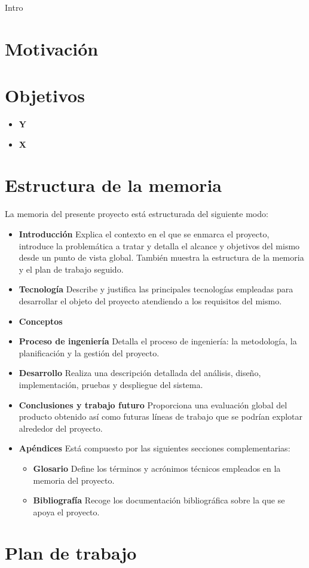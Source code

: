 Intro

\section{Motivación}


\section{Objetivos}

\begin{itemize}
\item \textbf{Y}
\item \textbf{X}
\end{itemize}


\section{Estructura de la memoria}
La memoria del presente proyecto está estructurada del siguiente modo:

\begin{itemize}
\item \textbf{Introducción} Explica el contexto en el que se enmarca el proyecto, introduce la problemática a tratar y detalla el alcance y objetivos del mismo desde un punto de vista global. También muestra la estructura de la memoria y el plan de trabajo seguido.

\item \textbf{Tecnología} Describe y justifica las principales tecnologías empleadas para desarrollar el objeto del proyecto atendiendo a los requisitos del mismo.

\item \textbf{Conceptos} 

\item \textbf{Proceso de ingeniería} Detalla el proceso de ingeniería: la metodología, la planificación y la gestión del proyecto.

\item \textbf{Desarrollo} Realiza una descripción detallada del análisis, diseño, implementación, pruebas y despliegue del sistema.

\item \textbf{Conclusiones y trabajo futuro} Proporciona una evaluación global del producto obtenido así como futuras líneas de trabajo que se podrían explotar alrededor del proyecto.

\item \textbf{Apéndices} Está compuesto por las siguientes secciones complementarias:
	\begin{itemize}
	\item \textbf{Glosario} Define los términos y acrónimos técnicos empleados en la memoria del proyecto.
	
	\item \textbf{Bibliografía} Recoge los documentación bibliográfica sobre la que se apoya el proyecto.
	\end{itemize}
\end{itemize}


\section{Plan de trabajo}
